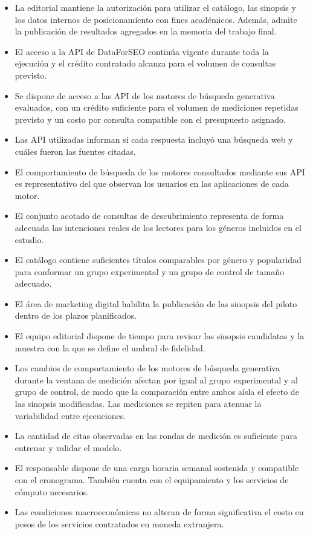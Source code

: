 \documentclass[
11pt, %
codirector, %
]{charter}
\begin{document}
\begin{itemize}
	\item La editorial mantiene la autorización para utilizar el catálogo, las sinopsis y los datos internos de posicionamiento con fines académicos. Además, admite la publicación de resultados agregados en la memoria del trabajo final.
	\item El acceso a la API de DataForSEO continúa vigente durante toda la ejecución y el crédito contratado alcanza para el volumen de consultas previsto.
	\item Se dispone de acceso a las API de los motores de búsqueda generativa evaluados, con un crédito suficiente para el volumen de mediciones repetidas previsto y un costo por consulta compatible con el presupuesto asignado.
	\item Las API utilizadas informan si cada respuesta incluyó una búsqueda web y cuáles fueron las fuentes citadas.
	\item El comportamiento de búsqueda de los motores consultados mediante sus API es representativo del que observan los usuarios en las aplicaciones de cada motor.
	\item El conjunto acotado de consultas de descubrimiento representa de forma adecuada las intenciones reales de los lectores para los géneros incluidos en el estudio.
	\item El catálogo contiene suficientes títulos comparables por género y popularidad para conformar un grupo experimental y un grupo de control de tamaño adecuado.
	\item El área de marketing digital habilita la publicación de las sinopsis del piloto dentro de los plazos planificados.
	\item El equipo editorial dispone de tiempo para revisar las sinopsis candidatas y la muestra con la que se define el umbral de fidelidad.
	\item Los cambios de comportamiento de los motores de búsqueda generativa durante la ventana de medición afectan por igual al grupo experimental y al grupo de control, de modo que la comparación entre ambos aísla el efecto de las sinopsis modificadas. Las mediciones se repiten para atenuar la variabilidad entre ejecuciones.
	\item La cantidad de citas observadas en las rondas de medición es suficiente para entrenar y validar el modelo.
	\item El responsable dispone de una carga horaria semanal sostenida y compatible con el cronograma. También cuenta con el equipamiento y los servicios de cómputo necesarios.
	\item Las condiciones macroeconómicas no alteran de forma significativa el costo en pesos de los servicios contratados en moneda extranjera.
\end{itemize}
\end{document}
